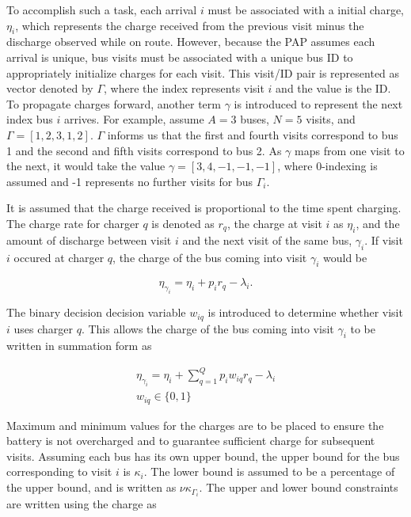 \documentclass[letterpaper, 10pt, conference]{IEEEtran}
\begin{document}
To accomplish such a task, each arrival $i$ must be associated with a initial charge, $\eta_i$, which represents the charge received from the previous visit minus the discharge observed while on route. However, because the PAP assumes each arrival is unique, bus visits must be associated with a unique bus ID to appropriately initialize charges for each visit. This visit/ID pair is represented as vector denoted by $\Gamma$, where the index represents visit $i$ and the value is the ID. To propagate charges forward, another term $\gamma$ is introduced to represent the next index bus $i$ arrives. For example, assume $A = 3$ buses, $N = 5$ visits, and $\Gamma = [1,2,3,1,2]$. $\Gamma$ informs us that the first and fourth visits correspond to bus 1 and the second and fifth visits correspond to bus 2. As $\gamma$ maps from one visit to the next, it would take the value $\gamma = [3,4,-1,-1,-1]$, where 0-indexing is assumed and -1 represents no further visits for bus $\Gamma_i$.

It is assumed that the charge received is proportional to the time spent charging. The charge rate for charger $q$ is denoted as $r_q$, the charge at visit $i$ as $\eta_i$, and the amount of discharge between visit $i$ and the next visit of the same bus, $\gamma_i$. If visit $i$ occured at charger $q$, the charge of the bus coming into visit $\gamma_i$ would be

\begin{equation}
	\eta_{\gamma_i} = \eta_i + p_i r_q - \lambda_i.
\end{equation}

The binary decision decision variable $w_{iq}$ is introduced to determine whether visit $i$ uses charger $q$. This allows the charge of the bus coming into visit $\gamma_i$ to be written in summation form as

\begin{subequations}
\begin{align}
    \eta_{\gamma_i} = \eta_i + \sum_{q=1}^Q p_i w_{iq} r_q - \lambda_i \\
    w_{iq} \in \{0,1\}
\end{align}
\end{subequations}

Maximum and minimum values for the charges are to be placed to ensure the battery is not overcharged and to guarantee sufficient charge for subsequent visits. Assuming each bus has its own upper bound, the upper bound for the bus corresponding to visit $i$ is $\kappa_i$. The lower bound is assumed to be a percentage of the upper bound, and is written as $\nu \kappa_{\Gamma_i}$. The upper and lower bound constraints are written using the charge as
\end{document}
